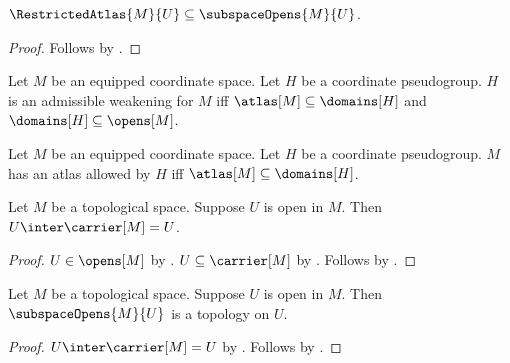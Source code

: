 \begin{proposition}\label{restricted_atlas_open}
    $\RestrictedAtlas{M}{U}\subseteq\subspaceOpens{M}{U}$.
\end{proposition}
\begin{proof}
    Follows by .
\end{proof}

\begin{definition}\label{admissible_weakening}
    Let $M$ be an equipped coordinate space.
    Let $H$ be a coordinate pseudogroup.
    $H$ is an admissible weakening for $M$ iff
        $\atlas[M]\subseteq\domains[H]$ and $\domains[H]\subseteq\opens[M]$.
\end{definition}

\begin{definition}\label{allowed_atlas}
    Let $M$ be an equipped coordinate space.
    Let $H$ be a coordinate pseudogroup.
    $M$ has an atlas allowed by $H$ iff $\atlas[M]\subseteq\domains[H]$.
\end{definition}

\begin{proposition}\label{open_subspace_carrier}
    Let $M$ be a topological space.
    Suppose $U$ is open in $M$.
    Then $U\inter\carrier[M]=U$.
\end{proposition}
\begin{proof}
    $U\in\opens[M]$ by .
    $U\subseteq\carrier[M]$ by .
    Follows by .
\end{proof}

\begin{proposition}\label{open_subspace_topology}
    Let $M$ be a topological space.
    Suppose $U$ is open in $M$.
    Then $\subspaceOpens{M}{U}$ is a topology on $U$.
\end{proposition}
\begin{proof}
    $U\inter\carrier[M]=U$ by .
    Follows by .
\end{proof}
